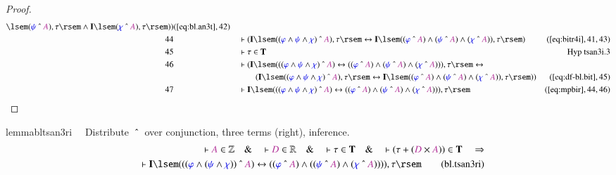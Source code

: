 \begin{proof}
\begin{align}
      \lsem ( \mw{\psi} ~\string^~ \mc{A} ) , \tau \rsem
      \wedge \mathbf{I} \lsem ( \mw{\chi} ~\string^~ \mc{A}
      ) , \tau \rsem ) )&(\mbox{\ref{eq:bl.an3t}},42)\notag
  \\ 44 &&  & \vdash ( \mathbf{I} \lsem ( ( \mw{\varphi} \wedge \mw{\psi}
      \wedge \mw{\chi} ) ~\string^~ \mc{A} ) , \tau \rsem
      \leftrightarrow \mathbf{I} \lsem ( ( \mw{\varphi}
      ~\string^~ \mc{A} ) \wedge ( \mw{\psi} ~\string^~
      \mc{A} ) \wedge ( \mw{\chi} ~\string^~ \mc{A} ) ) ,
      \tau \rsem )&(\mbox{\ref{eq:bitr4i}},41,43)\notag
  \\ 45 &&  & \vdash \tau \in \mathbf{T}&\text{Hyp~tsan3i.3}\notag%
  \\ 46 &&  & \vdash ( \mathbf{I} \lsem ( ( ( \mw{\varphi} \wedge \mw{\psi}
      \wedge \mw{\chi} ) ~\string^~ \mc{A} )
      \leftrightarrow ( ( \mw{\varphi} ~\string^~ \mc{A} )
      \wedge ( \mw{\psi} ~\string^~ \mc{A} ) \wedge (
      \mw{\chi} ~\string^~ \mc{A} ) ) ) , \tau \rsem
      \leftrightarrow  \notag \\ & & & \qquad
     ( \mathbf{I} \lsem ( ( \mw{\varphi}
      \wedge \mw{\psi} \wedge \mw{\chi} ) ~\string^~ \mc{A}
      ) , \tau \rsem \leftrightarrow \mathbf{I} \lsem ( (
      \mw{\varphi} ~\string^~ \mc{A} ) \wedge ( \mw{\psi}
      ~\string^~ \mc{A} ) \wedge ( \mw{\chi} ~\string^~
      \mc{A} ) ) , \tau \rsem )
      )&(\mbox{\ref{eq:df-bl.bit}},45)\notag
  \\ 47 &&  & \vdash \mathbf{I} \lsem ( ( ( \mw{\varphi} \wedge \mw{\psi}
      \wedge \mw{\chi} ) ~\string^~ \mc{A} )
      \leftrightarrow ( ( \mw{\varphi} ~\string^~ \mc{A} )
      \wedge ( \mw{\psi} ~\string^~ \mc{A} ) \wedge (
      \mw{\chi} ~\string^~ \mc{A} ) ) ) , \tau
      \rsem&(\mbox{\ref{eq:mpbir}},44,46)\notag
\end{align}
\end{proof}

\begin{restatable}{lemma}{bltsan3ri}~~ Distribute $~\string^~$ over
conjunction, three terms (right), inference.
\begin{align}
\vdash \mc{A} \in \mathbb{Z}\quad\&\quad \vdash \mc{D} \in
    \mathbb{R}\quad\&\quad \vdash \tau \in \mathbf{T}\quad\&\quad \vdash ( \tau
    + ( \mc{D} \times \mc{A} ) ) \in \mathbf{T}\quad\Rightarrow \notag \\ %
     \quad \vdash
    \mathbf{I} \lsem ( ( ( \mw{\varphi} \wedge ( \mw{\psi} \wedge \mw{\chi} ) )
    ~\string^~ \mc{A} ) \leftrightarrow ( ( \mw{\varphi} ~\string^~ \mc{A} )
    \wedge ( ( \mw{\psi} ~\string^~ \mc{A} ) \wedge ( \mw{\chi} ~\string^~
    \mc{A} ) ) ) ) , \tau \rsem\label{eq:bl.tsan3ri}\tag{bl.tsan3ri}
\end{align}
\end{restatable}

